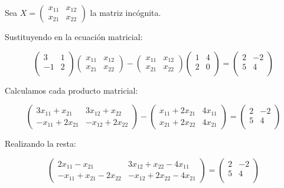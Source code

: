 \begin{myproof}
Sea $X = \left( \begin{array}{cc} x_{11} & x_{12} \\ x_{21} & x_{22} \end{array} \right)$ la matriz incógnita.

Sustituyendo en la ecuación matricial:

$$\left( \begin{array}{cc}
3&1\\
-1&2\\ \end{array} \right) \left( \begin{array}{cc} x_{11} & x_{12} \\ x_{21} & x_{22} \end{array} \right) - \left( \begin{array}{cc} x_{11} & x_{12} \\ x_{21} & x_{22} \end{array} \right) \left( \begin{array}{cc}
1&4\\
2&0\\ \end{array} \right) = \left( \begin{array}{cc}
2&-2\\
5&4\\ \end{array} \right)$$

Calculamos cada producto matricial:

$$\left( \begin{array}{cc}
3x_{11} + x_{21} & 3x_{12} + x_{22} \\
-x_{11} + 2x_{21} & -x_{12} + 2x_{22}
\end{array} \right) - \left( \begin{array}{cc}
x_{11} + 2x_{21} & 4x_{11} \\
x_{21} + 2x_{22} & 4x_{21}
\end{array} \right) = \left( \begin{array}{cc}
2&-2\\
5&4\\ \end{array} \right)$$

Realizando la resta:

$$\left( \begin{array}{cc}
2x_{11} - x_{21} & 3x_{12} + x_{22} - 4x_{11} \\
-x_{11} + x_{21} - 2x_{22} & -x_{12} + 2x_{22} - 4x_{21}
\end{array} \right) = \left( \begin{array}{cc}
2&-2\\
5&4\\ \end{array} \right)$$


\end{myproof}
